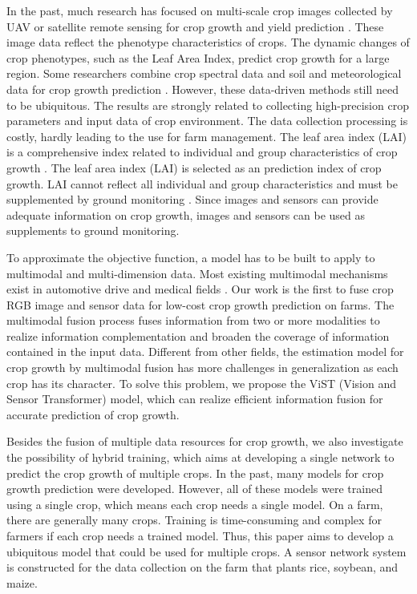 \documentclass[acmsmall,manuscript, screen, review]{acmart}
\begin{document}
In the past, much research has focused on multi-scale crop images collected by UAV or satellite remote sensing for crop growth and yield prediction \cite{wang_new_2022,yue_estimate_2019,turkoglu_crop_2021}. These image data reflect the phenotype characteristics of crops. The dynamic changes of crop phenotypes, such as the Leaf Area Index, predict crop growth for a large region. Some researchers combine crop spectral data and soil and meteorological data for crop growth prediction \cite{trnka_effect_2007,islam_deep_2018,adisa_application_2019,liu_neural_2001,matsumura_maize_2015}. However, these data-driven methods still need to be ubiquitous. The results are strongly related to collecting high-precision crop parameters and input data of crop environment. The data collection processing is costly, hardly leading to the use for farm management. The leaf area index (LAI) is a comprehensive index related to individual and group characteristics of crop growth \cite{__1999}. The leaf area index (LAI) is selected as an prediction index of crop growth. LAI cannot reflect all individual and group characteristics and must be supplemented by ground monitoring \cite{carlson_relation_1997}. Since images and sensors can provide adequate information on crop growth, images and sensors can be used as supplements to ground monitoring. 

To approximate the objective function, a model has to be built to apply to multimodal and multi-dimension data. Most existing multimodal mechanisms exist in automotive drive and medical fields \cite{guo2019deep, xiao2020multimodal}. Our work is the first to fuse crop RGB image and sensor data for low-cost crop growth prediction on farms. The multimodal fusion process fuses information from two or more modalities to realize information complementation and broaden the coverage of information contained in the input data. Different from other fields, the estimation model for crop growth by multimodal fusion has more challenges in generalization as each crop has its character. To solve this problem, we propose the ViST (Vision and Sensor Transformer) model, which can realize efficient information fusion for accurate prediction of crop growth.

Besides the fusion of multiple data resources for crop growth, we also investigate the possibility of hybrid training, which aims at developing a single network to predict the crop growth of multiple crops. In the past, many models for crop growth prediction were developed. However, all of these models were trained using a single crop, which means each crop needs a single model. On a farm, there are generally many crops. Training is time-consuming and complex for farmers if each crop needs a trained model. Thus, this paper aims to develop a ubiquitous model that could be used for multiple crops. A sensor network system is constructed for the data collection on the farm that plants rice, soybean, and maize.
\end{document}

